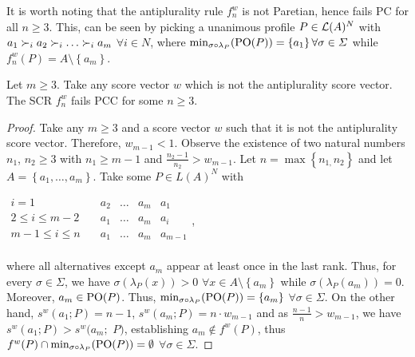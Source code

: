 \documentclass[version=3.21, pagesize, twoside=off, bibliography=totoc, DIV=calc, fontsize=12pt, a4paper]{scrartcl}
\begin{document}
It is worth noting that the antiplurality rule $f_{n}^{w}$ is not Paretian, hence fails PC  for all $n\geq 3$. This, can be seen by picking a unanimous profile $P\in \mathcal{L}(A)^{N}$ with $a_{1}\prefi a_{2}\prefi \dots \prefi a_{m}$ $\forall i\in N$, where $\mustar=\left\{ a_{1}\right\} \forall \sigma \in \Sigma $ while $f_{n}^{w}(P)=A \setminus \left\{ a_{m}\right\}$.

\begin{theorem}
	\label{th:srPCC}
	Let $m\geq 3.$ Take any score vector $w$ which is not the antiplurality score vector. The SCR $f_{n}^{w}$ fails PCC for some $n\geq 3$.
\end{theorem}

\begin{proof}
	Take any $m\geq 3$ and a score vector $w$ such that it is not the antiplurality score vector. Therefore, $w_{m-1}<1$. Observe the existence of two natural numbers $n_{1}$, $n_{2}\geq 3$ with $n_{1}\geq m-1$ and $\frac{n_{2}-1}{n_{2}}>w_{m-1}$.
	Let $n=\max \left\{ n_{1,}n_{2}\right\} $ and let $A=\left\{ a_{1}, \dots, a_{m}\right\} $. Take some $P\in L(A)^{N}$ with
	
	\begin{center}
		$
		\begin{array}{cccccc}
		i = 1 \quad & a_2 & … & a_m & a_1\\
		2 ≤ i ≤ m - 2 \quad & a_1 & … & a_m & a_i\\
		m - 1 ≤ i ≤ n \quad & a_1 & … & a_m & a_{m-1}\\
		\end{array}
		$,
	\end{center}
	where all alternatives except $a_m$ appear at least once in the last rank.
	Thus, for every $\sigma \in \Sigma$, we have 
	$\sigma (\lambda _{P}(x))>0$ $\forall x\in A \setminus \left\{ a_{m}\right\}$
	while
	$\sigma (\lambda_{P}(a_{m}))=0$. 
	Moreover, $a_{m}\in \text{PO}(P)$. Thus, $\mustar=\left\{ a_{m}\right\} $ $\forall \sigma \in \Sigma $. On the
	other hand, $s^{w}(a_{1}; P)=n-1$, $s^{w}(a_{m}; P)=n\cdot w_{m-1}$ and
	as $\frac{n-1}{n}>w_{m-1}$, we have $s^{w}(a_{1}; P)>s^{w}(a_{m};$ $P)$,
	establishing $a_{m}\notin f^{w}(P)$, thus $f^{w}(P)\cap \mustar=\emptyset $ $\forall \sigma \in \Sigma $.
\end{proof}
\end{document}
